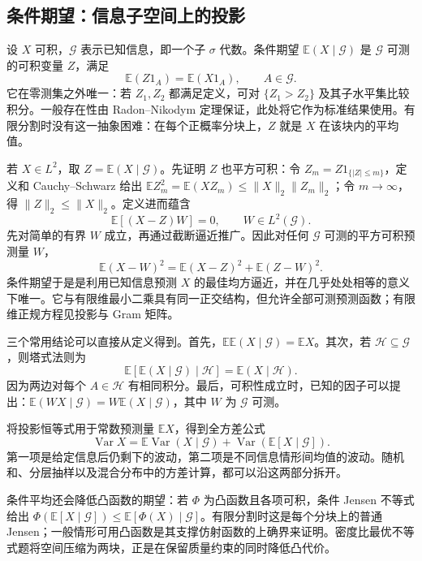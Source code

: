 \subsection{条件期望：信息子空间上的投影}

\label{app:probability-conditional}

设 $X$ 可积，$\mathcal G$ 表示已知信息，即一个子 $\sigma$ 代数。条件期望 $\mathbb E(X\mid\mathcal G)$ 是 $\mathcal G$ 可测的可积变量 $Z$，满足
\[
\mathbb E(Z1_A)=\mathbb E(X1_A),\qquad A\in\mathcal G.
\]
它在零测集之外唯一：若 $Z_1,Z_2$ 都满足定义，可对 $\{Z_1>Z_2\}$ 及其子水平集比较积分。一般存在性由 Radon--Nikodym 定理保证，此处将它作为标准结果使用。有限分割时没有这一抽象困难：在每个正概率分块上，$Z$ 就是 $X$ 在该块内的平均值。

若 $X\in L^2$，取 $Z=\mathbb E(X\mid\mathcal G)$。先证明 $Z$ 也平方可积：令 $Z_m=Z1_{\{|Z|\le m\}}$，定义和 Cauchy--Schwarz 给出 $\mathbb EZ_m^2=\mathbb E(XZ_m)\le\|X\|_2\|Z_m\|_2$；令 $m\to\infty$，得 $\|Z\|_2\le\|X\|_2$。定义进而蕴含
\[
\mathbb E[(X-Z)W]=0,\qquad W\in L^2(\mathcal G).
\]
先对简单的有界 $W$ 成立，再通过截断逼近推广。因此对任何 $\mathcal G$ 可测的平方可积预测量 $W$，
\[
\mathbb E(X-W)^2=\mathbb E(X-Z)^2+\mathbb E(Z-W)^2.
\]
条件期望于是是利用已知信息预测 $X$ 的最佳均方逼近，并在几乎处处相等的意义下唯一。它与有限维最小二乘具有同一正交结构，但允许全部可测预测函数；有限维正规方程见投影与 Gram 矩阵。

三个常用结论可以直接从定义得到。首先，$\mathbb E\mathbb E(X\mid\mathcal G)=\mathbb EX$。其次，若 $\mathcal H\subseteq\mathcal G$，则塔式法则为
\[
\mathbb E[\mathbb E(X\mid\mathcal G)\mid\mathcal H]
=\mathbb E(X\mid\mathcal H).
\]
因为两边对每个 $A\in\mathcal H$ 有相同积分。最后，可积性成立时，已知的因子可以提出：$\mathbb E(WX\mid\mathcal G)=W\mathbb E(X\mid\mathcal G)$，其中 $W$ 为 $\mathcal G$ 可测。

将投影恒等式用于常数预测量 $\mathbb EX$，得到全方差公式
\[
\operatorname{Var}X
=\mathbb E\operatorname{Var}(X\mid\mathcal G)
+\operatorname{Var}(\mathbb E[X\mid\mathcal G]).
\]
第一项是给定信息后仍剩下的波动，第二项是不同信息情形间均值的波动。随机和、分层抽样以及混合分布中的方差计算，都可以沿这两部分拆开。

条件平均还会降低凸函数的期望：若 $\Phi$ 为凸函数且各项可积，条件 Jensen 不等式给出 $\Phi(\mathbb E[X\mid\mathcal G])\le\mathbb E[\Phi(X)\mid\mathcal G]$。有限分割时这是每个分块上的普通 Jensen；一般情形可用凸函数是其支撑仿射函数的上确界来证明。密度比最优不等式题将空间压缩为两块，正是在保留质量约束的同时降低凸代价。

